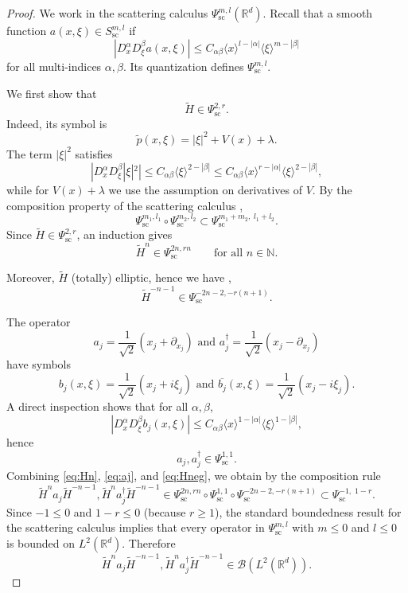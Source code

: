 \documentclass[11pt]{amsart}
\newcommand{\1}{\mathbbm{1}}
\theoremstyle{plain}
\theoremstyle{definition}
\theoremstyle{remark}
\numberwithin{equation}{section}
\begin{document}
\begin{proof}
We work in the scattering calculus $\Psi^{m,l}_{\mathrm{sc}}(\mathbb R^d)$. Recall \cite[(1.3)]{HassellJiaSussman2025} that a smooth function $a(x,\xi)\in S^{m,l}_{\mathrm{sc}}$ if
\[
|D_x^\alpha D_\xi^\beta a(x,\xi)|
\le C_{\alpha\beta}\langle x\rangle^{l-|\alpha|}\langle \xi\rangle^{m-|\beta|}
\]
for all multi-indices $\alpha,\beta.$
Its quantization \cite[(1.1)]{HassellJiaSussman2025} defines $\Psi^{m,l}_{\mathrm{sc}}$.

We first show that
\[
\widetilde H\in \Psi^{2,r}_{\mathrm{sc}}.
\]
Indeed, its symbol is
\[
\widetilde{p}(x,\xi)=|\xi|^2+V(x)+\lambda.
\]
The term $|\xi|^2$ satisfies
\[
|D_x^\alpha D_\xi^\beta |\xi|^2|
\le C_{\alpha\beta}\langle \xi\rangle^{2-|\beta|}
\le C_{\alpha\beta}\langle x\rangle^{r-|\alpha|}\langle \xi\rangle^{2-|\beta|},
\]
while for $V(x)+\lambda$ we use the assumption on derivatives of $V$. 
By the composition property of the scattering calculus \cite[(2.1)]{HassellJiaSussman2025},
\[
\Psi^{m_1,l_1}_{\mathrm{sc}}\circ \Psi^{m_2,l_2}_{\mathrm{sc}}
\subset \Psi^{m_1+m_2,\;l_1+l_2}_{\mathrm{sc}}.
\]
Since $\widetilde H\in \Psi^{2,r}_{\mathrm{sc}}$, an induction gives
\begin{equation}\label{eq:Hn}
\widetilde H^n\in \Psi^{2n,rn}_{\mathrm{sc}}
\qquad\text{for all }n\in\mathbb N.
\end{equation}

Moreover, $\widetilde H$ (totally) elliptic, hence we have \cite[Prop. 2.1]{HassellJiaSussman2025},
\begin{equation}\label{eq:Hneg}
\widetilde H^{-n-1}\in \Psi^{-2n-2,-r(n+1)}_{\mathrm{sc}}.
\end{equation}

The operator
\[
a_j=\frac1{\sqrt2}(x_j+\partial_{x_j}) \text{ and }a_j^{\dagger}=\frac1{\sqrt2}(x_j-\partial_{x_j})
\]
have symbols
\[
b_j(x,\xi)=\frac1{\sqrt2}(x_j+i\xi_j) \text{ and }\overline{b_j}(x,\xi)=\frac1{\sqrt2}(x_j-i\xi_j).
\]
A direct inspection shows that for all $\alpha,\beta$,
\[
|D_x^\alpha D_\xi^\beta b_j(x,\xi)|
\le C_{\alpha\beta}\langle x\rangle^{1-|\alpha|}\langle \xi\rangle^{1-|\beta|},
\]
hence
\begin{equation}\label{eq:aj}
a_j,a_j^{\dagger}\in \Psi^{1,1}_{\mathrm{sc}}.
\end{equation}
Combining \eqref{eq:Hn}, \eqref{eq:aj}, and \eqref{eq:Hneg}, we obtain by the composition rule \cite[(2.1)]{HassellJiaSussman2025}
\[
\widetilde H^n a_j \widetilde H^{-n-1},\widetilde H^n a_j^{\dagger}
 \widetilde H^{-n-1}
\in
\Psi^{2n,rn}_{\mathrm{sc}}
\circ
\Psi^{1,1}_{\mathrm{sc}}
\circ
\Psi^{-2n-2,-r(n+1)}_{\mathrm{sc}} \subset \Psi^{-1,\;1-r}_{\mathrm{sc}}.
\]
Since $-1\le 0$ and $1-r\le 0$ (because $r\ge 1$), the standard boundedness
result for the scattering calculus \cite[Prop. 3.6]{HassellJiaSussman2025} implies that every operator in
$\Psi^{m,l}_{\mathrm{sc}}$ with $m\le 0$ and $l\le 0$ is bounded on $L^2(\mathbb R^d)$.
Therefore
\[
\widetilde H^n a_j \widetilde H^{-n-1},\widetilde H^n a_j^{\dagger} \widetilde H^{-n-1}\in \mathcal B(L^2(\mathbb R^d)).
\]

\end{proof}
\end{document}
